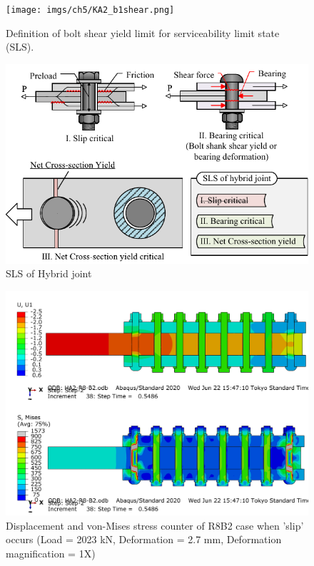 \begin{figure}[htbp]
    \centering
    \texttt{[image: imgs/ch5/KA2\_b1shear.png]}
    \caption{Definition of bolt shear yield limit for serviceability limit state (SLS).}
    \label{fig-defboltshear}
\end{figure}

\begin{figure}[htbp]
    \centering
    \includegraphics[width=0.9\linewidth]{imgs/ch5/slsofhybridj.pdf}
    \caption{SLS of Hybrid joint}
    \label{fig-slsofhj}
\end{figure}

\begin{figure}[htbp]
    \centering
    \includegraphics[width=0.9\linewidth]{imgs/ch5/R8B2slip.png}
    \caption{Displacement and von-Mises stress counter of R8B2 case when 'slip' occurs (Load = 2023 kN, Deformation = 2.7 mm, Deformation magnification = 1X)}
    \label{figc-R8B2slip}
\end{figure}


